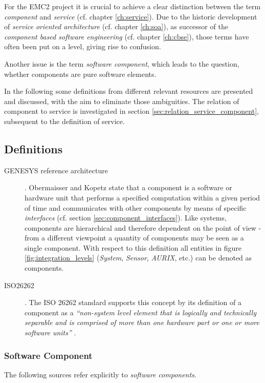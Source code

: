 \label{ch:component}

For the EMC2 project it is crucial to achieve a clear distinction between the term \emph{component} and \emph{service} (cf. chapter \ref{ch:service}). Due to the historic development of \emph{service oriented architecture} (cf. chapter \ref{ch:soa}), as successor of the \emph{component based software engineering} (cf. chapter \ref{ch:cbse}), those terms have often been put on a level, giving rise to confusion. 

Another issue is the term \emph{software component}, which leads to the question, whether components are pure software elements.

In the following some definitions from different relevant resources are presented and discussed, with the aim to eliminate those ambiguities. The relation of component to service is investigated in section \ref{sec:relation_service_component}, subsequent to the definition of service.

\subsection{Definitions}

\begin{description}
	\item [GENESYS reference architecture] .
	Obermaisser and Kopetz state that a component is a software or hardware unit that performs a specified computation within a given period of time \cite[p.38]{genesys} and communicates with other components by means of specific \emph{interfaces} (cf. section \ref{sec:component_interfaces}). Like systems, components are hierarchical and therefore dependent on the point of view - from a different viewpoint a quantity of components may be seen as a single component. With respect to this definition all entities in figure \ref{fig:integration_levels} (\emph{System}, \emph{Sensor}, \emph{AURIX}, etc.) can be denoted as components.

	\item [ISO26262] .
	The ISO 26262 standard supports this concept by its definition of a component as a \emph{``non-system level element that is logically and technically separable and is comprised of more than one hardware part or one or more software units''} \cite{iso26262:1}.
\end{description}


\subsubsection{Software Component}
The following sources refer explicitly to \emph{software components}.

